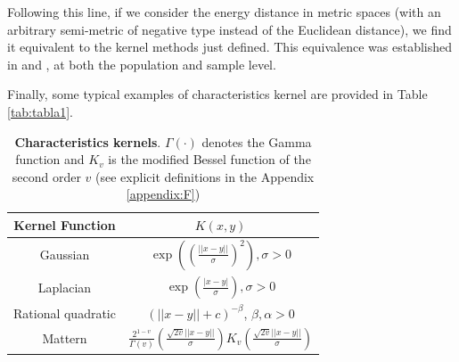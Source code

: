 \documentclass[11pt]{article}
\begin{document}
	
	
Following this line, if we consider the  energy distance in metric spaces \cite{lyons2013distance} (with an arbitrary semi-metric of negative type instead of the Euclidean distance), we find it equivalent to the kernel methods just defined. This equivalence was established in \cite{sejdinovic2013equivalence} and \cite{shen2018exact}, at both the population and sample level.

	
	Finally, some typical  examples  of characteristics kernel 	\cite{sriperumbudur2010hilbert}  are provided in Table \ref{tab:tabla1}.
	
	
	
	\begin{table}[t!]
		\begin{center}
			\caption{	\label{tab:tabla1}	\textbf{Characteristics kernels}.
				$\Gamma(\cdot)$ denotes the Gamma function and $K_v$ is the modified Bessel
				function of the second order
				$v$ (see explicit definitions in the Appendix \ref{appendix:F})}
			\label{tab:table1}
			\begin{tabular}{c|c} %
				\textbf{Kernel Function} & \textbf{$K(x,y)$} \\ 
				\hline
				Gaussian & $\exp((\frac{||x-y||}{\sigma})^2), \sigma>0$ \\ 
				Laplacian &  $\exp(\frac{|x-y|}{\sigma}),   \sigma>0$ \\
				Rational quadratic & $(||x-y||+c)^{-\beta}$, $\beta,\alpha>0$ \\
				Mattern   & $\frac{2^{1-v}}{\Gamma(v)}(\frac{\sqrt{2v}||x-y||}{\sigma})K_v(\frac{\sqrt{2v}||x-y||}{\sigma})$ \\
				
			\end{tabular}
		\end{center}
	\end{table}
	 
	 
	 
	 

	 
	 
	 
	 
\end{document}
